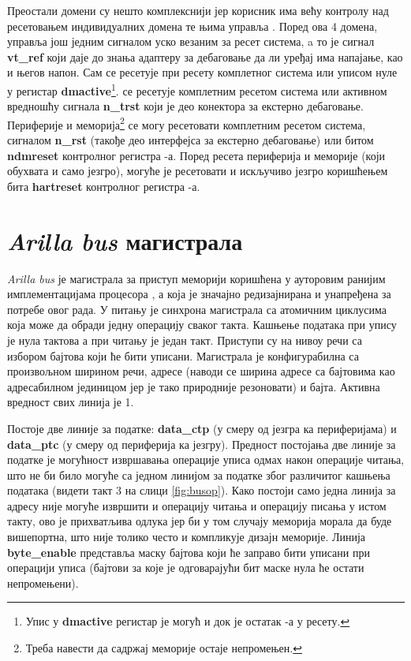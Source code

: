 Преостали домени су нешто комплекснији јер корисник има већу контролу над ресетовањем индивидуалних домена те њима управља . Поред ова 4 домена,  управља још једним сигналом уско везаним за ресет система, a то је сигнал \textbf{vt\_ref} који даје до знања адаптеру за дебаговање да ли уређај има напајање, као и његов напон.
Сам  се ресетује при ресету комплетног система или уписом нуле у регистар \textbf{dmactive}\footnote{Упис у \textbf{dmactive} регистар је могућ и док је остатак -а у ресету.}.
 се ресетује комплетним ресетом система или активном вредношћу сигнала \textbf{n\_trst} који је део конектора за екстерно дебаговање.
Периферије и меморија\footnote{Треба навести да садржај меморије остаје непромењен.} се могу ресетовати комплетним ресетом система, сигналом \textbf{n\_rst} (такође део интерфејса за екстерно дебаговање) или битом \textbf{ndmreset} контролног регистра -а.
Поред ресета периферија и меморије (који обухвата и само језгро), могуће је ресетовати и искључиво језгро коришћењем бита \textbf{hartreset} контролног регистра -а.

\section{\textit{Arilla bus} магистрала}

\textit{Arilla bus} је магистрала за приступ меморији коришћена у ауторовим ранијим имплементацијама  процесора \cite{arilla}, а која је значајно редизајнирана и унапређена за потребе овог рада. У питању је синхрона магистрала са атомичним циклусима која може да обради једну операцију сваког такта. Кашњење података при упису је нула тактова а при читању је један такт. Приступи су на нивоу речи са избором бајтова који ће бити уписани.
Магистрала је конфигурабилна са произвољном ширином речи, адресе (наводи се ширина адресе са бајтовима као адресабилном јединицом јер је тако природније резоновати) и бајта. Активна вредност свих линија је 1.



Постоје две линије за податке: \textbf{data\_ctp} (у смеру од језгра ка периферијама) и \textbf{data\_ptc} (у смеру од периферија ка језгру). Предност постојања две линије за податке је могућност извршавања операције уписа одмах након операције читања, што не би било могуће са једном линијом за податке због различитог кашњења података (видети такт 3 на слици  \ref{fig:busop}). Како постоји само једна линија за адресу није могуће извршити и операцију читања и операцију писања у истом такту, ово је прихватљива одлука јер би у том случају меморија морала да буде вишепортна, што није толико често и компликује дизајн меморије. Линија \textbf{byte\_enable} представља маску бајтова који ће заправо бити уписани при операцији уписа (бајтови за које је одговарајући бит маске нула ће остати непромењени).

